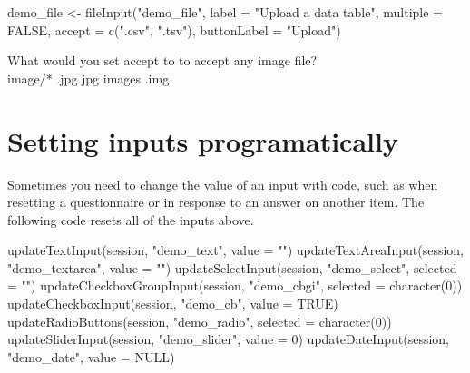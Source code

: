 \documentclass[
  oneside]{book}
\newenvironment{Shaded}{\begin{snugshade}}{\end{snugshade}}
\newcommand{\AttributeTok}[1]{\textcolor[rgb]{0.77,0.63,0.00}{#1}}
\newcommand{\ConstantTok}[1]{\textcolor[rgb]{0.00,0.00,0.00}{#1}}
\newcommand{\DecValTok}[1]{\textcolor[rgb]{0.00,0.00,0.81}{#1}}
\newcommand{\FunctionTok}[1]{\textcolor[rgb]{0.00,0.00,0.00}{#1}}
\newcommand{\NormalTok}[1]{#1}
\newcommand{\OtherTok}[1]{\textcolor[rgb]{0.56,0.35,0.01}{#1}}
\newcommand{\StringTok}[1]{\textcolor[rgb]{0.31,0.60,0.02}{#1}}
\begin{document}
\begin{Shaded}
\begin{Highlighting}[]
\NormalTok{demo\_file }\OtherTok{\textless{}{-}} \FunctionTok{fileInput}\NormalTok{(}\StringTok{"demo\_file"}\NormalTok{, }\AttributeTok{label =} \StringTok{"Upload a data table"}\NormalTok{, }\AttributeTok{multiple =} \ConstantTok{FALSE}\NormalTok{,}
    \AttributeTok{accept =} \FunctionTok{c}\NormalTok{(}\StringTok{".csv"}\NormalTok{, }\StringTok{".tsv"}\NormalTok{), }\AttributeTok{buttonLabel =} \StringTok{"Upload"}\NormalTok{)}
\end{Highlighting}
\end{Shaded}

What would you set \AttributeTok{accept} to to accept any image file?\\
image/* .jpg jpg images .img

\hypertarget{setting-inputs-programatically}{%
\section{Setting inputs programatically}\label{setting-inputs-programatically}}

Sometimes you need to change the value of an input with code, such as when resetting a questionnaire or in response to an answer on another item. The following code resets all of the inputs above.

\begin{Shaded}
\begin{Highlighting}[]
\FunctionTok{updateTextInput}\NormalTok{(session, }\StringTok{"demo\_text"}\NormalTok{, }\AttributeTok{value =} \StringTok{""}\NormalTok{)}
\FunctionTok{updateTextAreaInput}\NormalTok{(session, }\StringTok{"demo\_textarea"}\NormalTok{, }\AttributeTok{value =} \StringTok{""}\NormalTok{)}
\FunctionTok{updateSelectInput}\NormalTok{(session, }\StringTok{"demo\_select"}\NormalTok{, }\AttributeTok{selected =} \StringTok{""}\NormalTok{)}
\FunctionTok{updateCheckboxGroupInput}\NormalTok{(session, }\StringTok{"demo\_cbgi"}\NormalTok{, }\AttributeTok{selected =} \FunctionTok{character}\NormalTok{(}\DecValTok{0}\NormalTok{))}
\FunctionTok{updateCheckboxInput}\NormalTok{(session, }\StringTok{"demo\_cb"}\NormalTok{, }\AttributeTok{value =} \ConstantTok{TRUE}\NormalTok{)}
\FunctionTok{updateRadioButtons}\NormalTok{(session, }\StringTok{"demo\_radio"}\NormalTok{, }\AttributeTok{selected =} \FunctionTok{character}\NormalTok{(}\DecValTok{0}\NormalTok{))}
\FunctionTok{updateSliderInput}\NormalTok{(session, }\StringTok{"demo\_slider"}\NormalTok{, }\AttributeTok{value =} \DecValTok{0}\NormalTok{)}
\FunctionTok{updateDateInput}\NormalTok{(session, }\StringTok{"demo\_date"}\NormalTok{, }\AttributeTok{value =} \ConstantTok{NULL}\NormalTok{)}
\end{Highlighting}
\end{Shaded}
\end{document}
